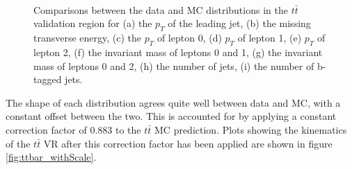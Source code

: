 \begin{figure}[H]
    \centering
    \\
    \\
    \\
    \caption{Comparisons between the data and MC distributions in the $t\bar{t}$ validation region for (a) the $p_T$ of the leading jet, (b) the missing transverse energy, (c) the $p_T$ of lepton 0, (d) $p_T$ of lepton 1, (e) $p_T$ of lepton 2, (f) the invariant mass of leptons 0 and 1, (g) the invariant mass of leptons 0 and 2, (h) the number of jets, (i) the number of b-tagged jets.}
    \label{fig:ttbar_noScale}
\end{figure}

The shape of each distribution agrees quite well between data and MC, with a constant offset between the two. This is accounted for by applying a constant correction factor of 0.883 to the $t\bar{t}$ MC prediction. Plots showing the kinematics of the $t\bar{t}$ VR after this correction factor has been applied are shown in figure \ref{fig:ttbar_withScale}.

